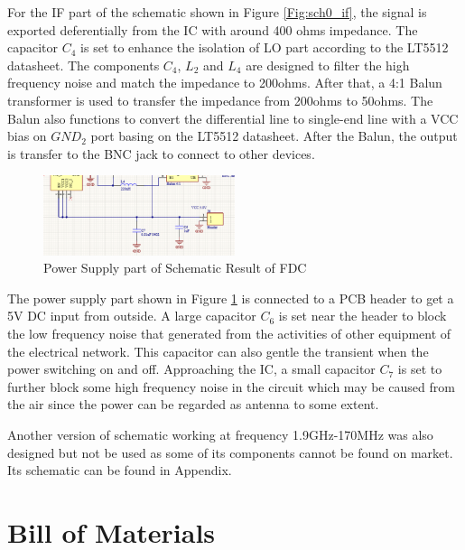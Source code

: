 \documentclass[12pt, a4paper]{report}
\begin{document}
For the IF part of the schematic shown in Figure \ref{Fig:sch0_if}, the signal is exported deferentially from the IC with around 400 ohms impedance. The capacitor $C_{4}$ is set to enhance the isolation of LO part according to the LT5512 datasheet\cite{ref:LT5512}. The components $C_{4}$, $L_{2}$ and $L_{4}$ are designed to filter the high frequency noise and match the impedance to 200ohms. After that, a 4:1 Balun transformer is used to transfer the impedance from 200ohms to 50ohms. The Balun also functions to convert the differential line to single-end line with a VCC bias on $GND_{2}$ port basing on the LT5512 datasheet\cite{ref:LT5512}. After the Balun, the output is transfer to the BNC jack to connect to other devices.

\begin{figure}[htbp]     \begin{centering}
    \includegraphics[width=0.5\textwidth]{img/sch0_vcc.png}
    \caption{\label{Fig:sch0_vcc}Power Supply part of Schematic Result of FDC}
    \end{centering}
    
\end{figure}

The power supply part shown in Figure \ref{Fig:sch0_vcc} is connected to a PCB header to get a 5V DC input from outside. A large capacitor $C_{6}$ is set near the header to block the low frequency noise that generated from the activities of other equipment of the electrical network. This capacitor can also gentle the transient when the power switching on and off. Approaching the IC, a small capacitor $C_{7}$ is set to further block some high frequency noise in the circuit which may be caused from the air since the power can be regarded as antenna to some extent.

Another version of schematic working at frequency 1.9GHz-170MHz was also designed but not be used as some of its components cannot be found on market. Its schematic can be found in Appendix.

\section{Bill of Materials}
\end{document}
